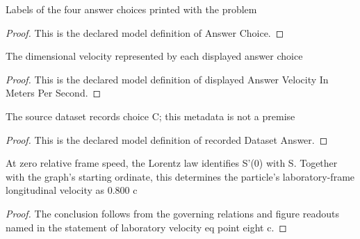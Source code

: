 \begin{definition}
  \label{def:physics:phyx-mini-0597:phyxminiproblems-problemphyxmini0597-answerchoice}
  Labels of the four answer choices printed with the problem
\end{definition}
\begin{proof}
  This is the declared model definition of Answer Choice.
\end{proof}
\begin{definition}
  \label{def:physics:phyx-mini-0597:phyxminiproblems-problemphyxmini0597-displayedanswervelocityinmeterspersecond}
  The dimensional velocity represented by each displayed answer choice
\end{definition}
\begin{proof}
  This is the declared model definition of displayed Answer Velocity In Meters Per Second.
\end{proof}
\begin{definition}
  \label{def:physics:phyx-mini-0597:phyxminiproblems-problemphyxmini0597-recordeddatasetanswer}
  The source dataset records choice C; this metadata is not a premise
\end{definition}
\begin{proof}
  This is the declared model definition of recorded Dataset Answer.
\end{proof}
\begin{lemma}
  \label{lem:physics:phyx-mini-0597:phyxminiproblems-problemphyxmini0597-laboratory-velocity-eq-point-eight-c}
  At zero relative frame speed, the Lorentz law identifies S'(0) with S. Together with the graph's starting ordinate, this determines the particle's laboratory-frame longitudinal velocity as 0.800 c
\end{lemma}
\begin{proof}
  The conclusion follows from the governing relations and figure readouts named in the statement of laboratory velocity eq point eight c.
\end{proof}
